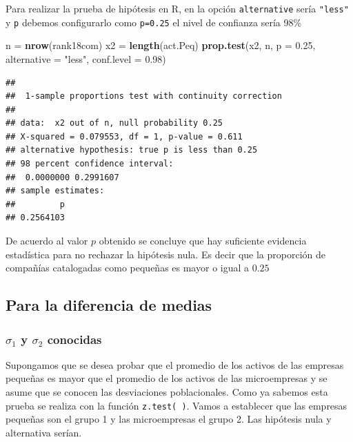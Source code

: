 \documentclass[letterpaper,]{book}
\newenvironment{Shaded}{\begin{snugshade}}{\end{snugshade}}
\newcommand{\DataTypeTok}[1]{\textcolor[rgb]{0.13,0.29,0.53}{#1}}
\newcommand{\FloatTok}[1]{\textcolor[rgb]{0.00,0.00,0.81}{#1}}
\newcommand{\KeywordTok}[1]{\textcolor[rgb]{0.13,0.29,0.53}{\textbf{#1}}}
\newcommand{\NormalTok}[1]{#1}
\newcommand{\StringTok}[1]{\textcolor[rgb]{0.31,0.60,0.02}{#1}}
\begin{document}
Para realizar la prueba de hipótesis en R, en la opción \texttt{alternative} sería \texttt{"less"} y \texttt{p} debemos configurarlo como \texttt{p=0.25} el nivel de confianza sería 98\%

\begin{Shaded}
\begin{Highlighting}[]
\NormalTok{n =}\StringTok{ }\KeywordTok{nrow}\NormalTok{(rank18com)}
\NormalTok{x2 =}\StringTok{ }\KeywordTok{length}\NormalTok{(act.Peq)}
\KeywordTok{prop.test}\NormalTok{(x2, n, }\DataTypeTok{p =} \FloatTok{0.25}\NormalTok{, }\DataTypeTok{alternative =} \StringTok{"less"}\NormalTok{,  }\DataTypeTok{conf.level =} \FloatTok{0.98}\NormalTok{)}
\end{Highlighting}
\end{Shaded}

\begin{verbatim}
## 
##  1-sample proportions test with continuity correction
## 
## data:  x2 out of n, null probability 0.25
## X-squared = 0.079553, df = 1, p-value = 0.611
## alternative hypothesis: true p is less than 0.25
## 98 percent confidence interval:
##  0.0000000 0.2991607
## sample estimates:
##         p 
## 0.2564103
\end{verbatim}

De acuerdo al valor \(p\) obtenido se concluye que hay suficiente evidencia estadística para no rechazar la hipótesis nula. Es decir que la proporción de compañías catalogadas como pequeñas es mayor o igual a \(0.25\)

\hypertarget{para-la-diferencia-de-medias}{%
\subsection{Para la diferencia de medias}\label{para-la-diferencia-de-medias}}

\hypertarget{sigma_1-y-sigma_2-conocidas-1}{%
\subsubsection{\texorpdfstring{\(\sigma_1\) y \(\sigma_2\) conocidas}{\textbackslash{}sigma\_1 y \textbackslash{}sigma\_2 conocidas}}\label{sigma_1-y-sigma_2-conocidas-1}}

Supongamos que se desea probar que el promedio de los activos de las empresas pequeñas es mayor que el promedio de los activos de las microempresas y se asume que se conocen las desviaciones poblacionales. Como ya sabemos esta prueba se realiza con la función \texttt{z.test(\ )}. Vamos a establecer que las empresas pequeñas son el grupo 1 y las microempresas el grupo 2. Las hipótesis nula y alternativa serían.
\end{document}
